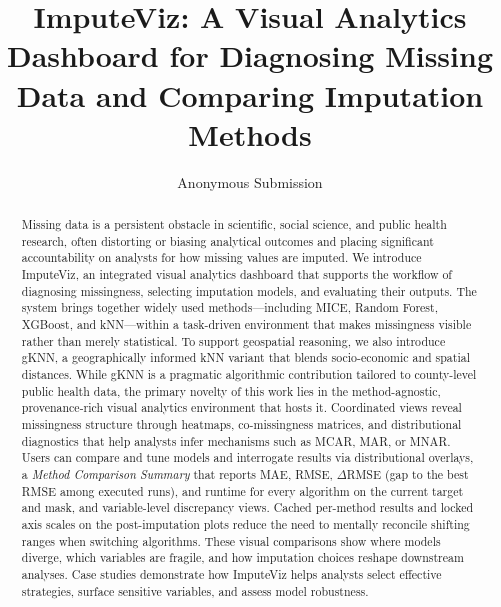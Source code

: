 \documentclass{egpubl}
\title[ImputeViz]{ImputeViz: A Visual Analytics Dashboard for Diagnosing Missing Data and Comparing Imputation Methods}
\author[Anonymous]{Anonymous Submission}
\begin{document}
\maketitle

\begin{abstract}
Missing data is a persistent obstacle in scientific, social science, and public health research, often distorting or biasing analytical outcomes and placing significant accountability on analysts for how missing values are imputed. We introduce ImputeViz, an integrated visual analytics dashboard that supports the workflow of diagnosing missingness, selecting imputation models, and evaluating their outputs. The system brings together widely used methods—including MICE, Random Forest, XGBoost, and kNN—within a task-driven environment that makes missingness visible rather than merely statistical. To support geospatial reasoning, we also introduce gKNN, a geographically informed kNN variant that blends socio-economic and spatial distances. While gKNN is a pragmatic algorithmic contribution tailored to county-level public health data, the primary novelty of this work lies in the method-agnostic, provenance-rich visual analytics environment that hosts it. Coordinated views reveal missingness structure through heatmaps, co-missingness matrices, and distributional diagnostics that help analysts infer mechanisms such as MCAR, MAR, or MNAR. Users can compare and tune models and interrogate results via distributional overlays, a \emph{Method Comparison Summary} that reports MAE, RMSE, $\Delta$RMSE (gap to the best RMSE among executed runs), and runtime for every algorithm on the current target and mask, and variable-level discrepancy views. Cached per-method results and locked axis scales on the post-imputation plots reduce the need to mentally reconcile shifting ranges when switching algorithms. These visual comparisons show where models diverge, which variables are fragile, and how imputation choices reshape downstream analyses. Case studies demonstrate how ImputeViz helps analysts select effective strategies, surface sensitive variables, and assess model robustness.





\end{abstract}
\end{document}
